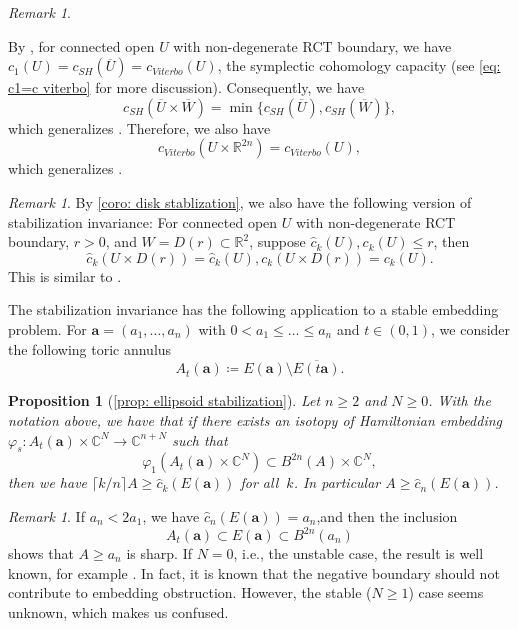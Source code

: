 \documentclass[11pt]{amsart}
\numberwithin{equation}{section}
\theoremstyle{plain}
\newtheorem{Prop}[prop]{Proposition}
\theoremstyle{definition}
\theoremstyle{remark}
\newtheorem{RMK}[rmk]{Remark}
\newcommand{\bC} { {\mathbb{C}}}
\newcommand{\bR} { {\mathbb{R}}}
\begin{document}
\begin{RMK}\label{Remark: non-equivariant capcities equivalence}

By \cite{Hochschild-Kuo-Shende-Zhang}, for connected open $U$ with non-degenerate RCT boundary, we have ${c}_1(U)=c_{SH}(\overline{U})=c_{Viterbo}(U)$, the symplectic cohomology capacity (see \autoref{eq: c1=c viterbo} for more discussion). Consequently, we have 
\[{c}_{SH}(\overline{U} \times \overline{W}) = \min\{{c}_{SH}(\overline{U}), {c}_{SH}(\overline{W})\},\]
which generalizes \cite[Proposition 2.5]{Biolley}. Therefore, we also have
\[c_{Viterbo}(U\times \bR^{2n})=c_{Viterbo}(U),\]
which generalizes \cite[Lemma 2.7]{Humiliere2008}.
\end{RMK} 
\begin{RMK}\label{remark: large radius disk stablization intro}By \autoref{coro: disk stablization}, we also have the following version of stabilization invariance: For connected open $U$ with non-degenerate RCT boundary, $r>0$, and $W=D(r)\subset \bR^2$, suppose $\widehat{c}_k(U), {c}_k(U)\leq r$, then 
\[\widehat{c}_k(U\times D(r))=\widehat{c}_k(U), c_k(U\times D(r))=c_k(U).\]
This is similar to \cite[Proposition 6.3]{SiegelHigherCapacities}.
\end{RMK}

 
The stabilization invariance has the following application to a stable embedding problem. For $\mathbf{a}=(a_1,\dots,a_n)$ with $0<a_1\leq \dots\leq a_n$ and $t\in (0,1)$, we consider the following toric annulus \[A_t(\mathbf{a})\coloneqq E(\mathbf{a})\setminus \overline{E(t\mathbf{a})}.\]
\begin{Prop}[{\autoref{prop: ellipsoid stabilization}}]Let $n\geq 2$ and $N\geq 0 $. With the notation above, we have that if there exists an isotopy of Hamiltonian embedding $\varphi_s:A_t(\mathbf{a})\times \bC^N \to \bC^{n+N}$ such that
\[\varphi_1(A_t(\mathbf{a})\times \bC^N)\subset B^{2n}(A)\times \bC^N,\]
then we have $\lceil k/n \rceil A\geq \widehat{c}_k(E(\mathbf{a}))$ for all $\ k$.
In particular $A\geq \widehat{c}_n(E(\mathbf{a}))$.
\end{Prop}
\begin{RMK}If $a_n<2a_1$, we have $\widehat{c}_n(E(\mathbf{a}))=a_n$,and then the inclusion
\[A_t(\mathbf{a})\subset E(\mathbf{a}) \subset B^{2n}(a_n)\]shows that $A\geq a_n$ is sharp. If $N=0$, i.e., the unstable case, the result is well known, for example \cite[Theorem 1]{Schlenk2003}. In fact, it is known that the negative boundary should not contribute to embedding obstruction. However, the stable ($N\geq 1$) case seems unknown, which makes us confused.
\end{RMK}
\end{document}
